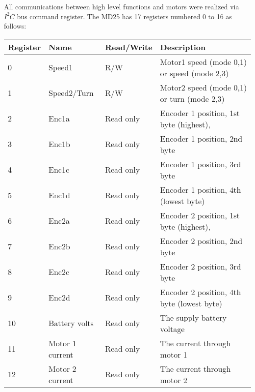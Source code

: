 All communications between high level functions and motors were realized via  $I^2C$ bus command register.
The MD25 has 17 registers numbered 0 to 16 as follows:
\begin{table}[!h]
	\begin{tabular}{@{}llll@{}}
		\toprule
		\textbf{Register} & \textbf{Name}     & \textbf{Read/Write} & \textbf{Description}                                             \\ \midrule
		0                 & Speed1            & R/W                 & Motor1 speed (mode 0,1) or speed (mode 2,3)                      \\
		1                 & Speed2/Turn       & R/W                 & Motor2 speed (mode 0,1) or turn (mode 2,3)                       \\
		2                 & Enc1a             & Read only           & Encoder 1 position, 1st byte (highest),   \\
		3                 & Enc1b             & Read only           & Encoder 1 position, 2nd byte                                     \\
		4                 & Enc1c             & Read only           & Encoder 1 position, 3rd byte                                     \\
		5                 & Enc1d             & Read only           & Encoder 1 position, 4th (lowest byte)                            \\
		6                 & Enc2a             & Read only           & Encoder 2 position, 1st  byte (highest),  \\
		7                 & Enc2b             & Read only           & Encoder 2 position, 2nd byte                                     \\
		8                 & Enc2c             & Read only           & Encoder 2 position, 3rd byte                                     \\
		9                 & Enc2d             & Read only           & Encoder 2 position, 4th byte (lowest byte)                       \\
		10                & Battery volts     & Read only           & The supply battery voltage                                       \\
		11                & Motor 1 current   & Read only           & The current through motor 1                                      \\
		12                & Motor 2 current   & Read only           & The current through motor 2                                      \\

\end{tabular}
\end{table}
